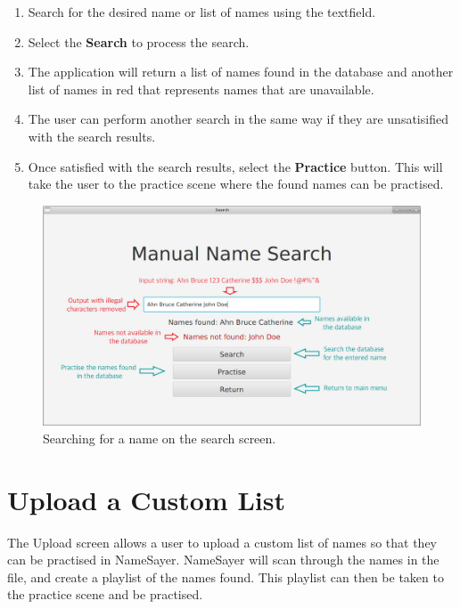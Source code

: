 \documentclass{article}
\begin{document}
\begin{enumerate}
	\item Search for the desired name or list of names using the textfield.

	\item Select the \textbf{Search} to process the search.

	\item The application will return a list of names found in the database and
	another list of names in red that represents names that are unavailable.

	\item The user can perform another search in the same way if they are
	unsatisified with the search results.

	\item Once satisfied with the search results, select the \textbf{Practice}
	button. This will take the user to the practice scene where the found names
	can be practised.

\end{enumerate}

\begin{figure}[H]
	\includegraphics[width=\textwidth]{images/4_search.jpg}
	\caption{Searching for a name on the search screen.}
	\label{search}
\end{figure}

\section{Upload a Custom List}
The Upload screen allows a user to upload a custom list of names so that they
can be practised in NameSayer.  NameSayer will scan through the names in the
file, and create a playlist of the names found. This playlist can then be taken
to the practice scene and be practised.
\end{document}
